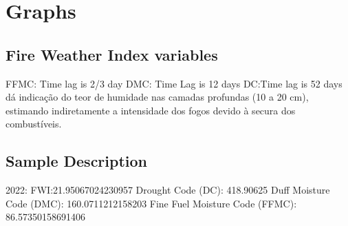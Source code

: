 \chapter{Graphs}
\label{sec:graphs}


\section{Fire Weather Index variables}
FFMC: Time lag is 2/3 day
DMC: Time Lag is 12 days
DC:Time lag is 52 days \cite{AICC} dá indicação do teor de humidade nas camadas
profundas (10 a 20 cm), estimando indiretamente a intensidade dos fogos devido à secura dos
combustíveis.

\section{Sample Description}
2022:
FWI:21.95067024230957
Drought Code (DC):  418.90625
Duff Moisture Code (DMC):  160.0711212158203
Fine Fuel Moisture Code (FFMC):  86.57350158691406

